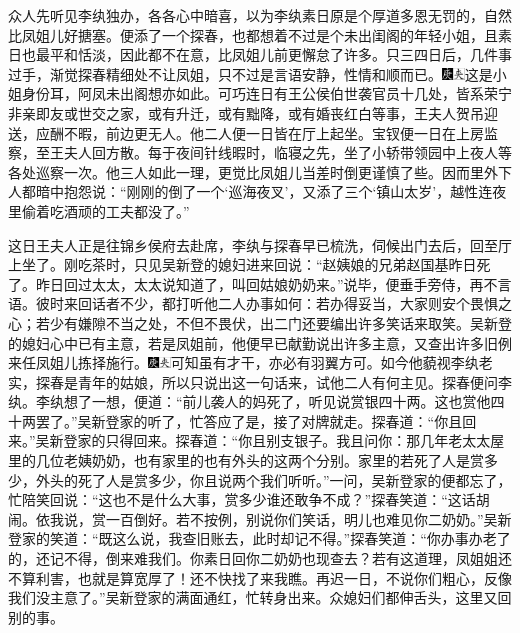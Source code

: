 众人先听见李纨独办，各各心中暗喜，以为李纨素日原是个厚道多恩无罚的，自然比凤姐儿好搪塞。便添了一个探春，也都想着不过是个未出闺阁的年轻小姐，且素日也最平和恬淡，因此都不在意，比凤姐儿前更懈怠了许多。只三四日后，几件事过手，渐觉探春精细处不让凤姐，只不过是言语安静，性情和顺而已。{\includegraphics[width=3mm]{../Images/00004}\includegraphics[width=3mm]{../Images/00012}\footnotesize \kaishu 这是小姐身份耳，阿凤未出阁想亦如此。}可巧连日有王公侯伯世袭官员十几处，皆系荣宁非亲即友或世交之家，或有升迁，或有黜降，或有婚丧红白等事，王夫人贺吊迎送，应酬不暇，前边更无人。他二人便一日皆在厅上起坐。宝钗便一日在上房监察，至王夫人回方散。每于夜间针线暇时，临寝之先，坐了小轿带领园中上夜人等各处巡察一次。他三人如此一理，更觉比凤姐儿当差时倒更谨慎了些。因而里外下人都暗中抱怨说：``刚刚的倒了一个`巡海夜叉'，又添了三个`镇山太岁'，越性连夜里偷着吃酒顽的工夫都没了。''

这日王夫人正是往锦乡侯府去赴席，李纨与探春早已梳洗，伺候出门去后，回至厅上坐了。刚吃茶时，只见吴新登的媳妇进来回说：``赵姨娘的兄弟赵国基昨日死了。昨日回过太太，太太说知道了，叫回姑娘奶奶来。''说毕，便垂手旁侍，再不言语。彼时来回话者不少，都打听他二人办事如何：若办得妥当，大家则安个畏惧之心；若少有嫌隙不当之处，不但不畏伏，出二门还要编出许多笑话来取笑。吴新登的媳妇心中已有主意，若是凤姐前，他便早已献勤说出许多主意，又查出许多旧例来任凤姐儿拣择施行。{\includegraphics[width=3mm]{../Images/00004}\includegraphics[width=3mm]{../Images/00012}\footnotesize \kaishu 可知虽有才干，亦必有羽翼方可。}如今他藐视李纨老实，探春是青年的姑娘，所以只说出这一句话来，试他二人有何主见。探春便问李纨。李纨想了一想，便道：``前儿袭人的妈死了，听见说赏银四十两。这也赏他四十两罢了。''吴新登家的听了，忙答应了是，接了对牌就走。探春道：``你且回来。''吴新登家的只得回来。探春道：``你且别支银子。我且问你：那几年老太太屋里的几位老姨奶奶，也有家里的也有外头的这两个分别。家里的若死了人是赏多少，外头的死了人是赏多少，你且说两个我们听听。''一问，吴新登家的便都忘了，忙陪笑回说：``这也不是什么大事，赏多少谁还敢争不成？''探春笑道：``这话胡闹。依我说，赏一百倒好。若不按例，别说你们笑话，明儿也难见你二奶奶。''吴新登家的笑道：``既这么说，我查旧账去，此时却记不得。''探春笑道：``你办事办老了的，还记不得，倒来难我们。你素日回你二奶奶也现查去？若有这道理，凤姐姐还不算利害，也就是算宽厚了！还不快找了来我瞧。再迟一日，不说你们粗心，反像我们没主意了。''吴新登家的满面通红，忙转身出来。众媳妇们都伸舌头，这里又回别的事。

